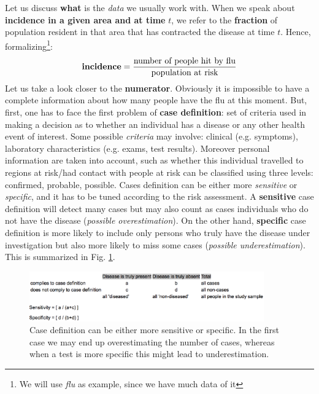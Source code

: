 \documentclass[../main/main.tex]{subfiles}
\begin{document}
Let us discuss \textbf{what} is the \textit{data} we usually work with. When we speak about \textbf{incidence in a given area and at time} $t$, we refer to the \textbf{fraction} of population resident in that area that has contracted the disease at time $t$. Hence, formalizing\footnote{We will use \textit{flu} as example, since we have much data of it}:
\begin{equation}
    \text{\textbf{incidence}} = \frac{\text{number of people hit by flu}}{\text{population at risk}}
\end{equation}
Let us take a look closer to the \textbf{numerator}. Obviously it is impossible to have a complete information about how many people have the flu at this moment. But, first, one has to face the first problem of \textbf{case definition}: set of criteria used in making a decision as to whether an individual has a disease or any other health event of interest. Some possible \textit{criteria} may involve: clinical (e.g. symptoms), laboratory characteristics (e.g. exams, test results). Moreover personal information are taken into account, such as whether this individual travelled to regions at risk/had contact with people at risk can be classified using three levels: confirmed, probable, possible. Cases definition can be either more \textit{sensitive} or \textit{specific}, and it has to be tuned according to the risk assessment. A \textbf{sensitive} case definition will detect many cases but may also count as cases individuals who do not have the disease (\textit{possible overestimation}). On the other hand, \textbf{specific} case definition is more likely to include only persons who truly have the disease under investigation but also more likely to miss some cases (\textit{possible underestimation}). This is summarized in Fig. \ref{fig:19_02}.

\begin{figure}[h!]
\centering
\includegraphics[width=0.9\textwidth]{../lessons/image/19/image02.png}
\caption{\label{fig:19_02} Case definition can be either more sensitive or specific. In the first case we may end up overestimating the number of cases, whereas when a test is more specific this might lead to underestimation.}
\end{figure}
\end{document}
